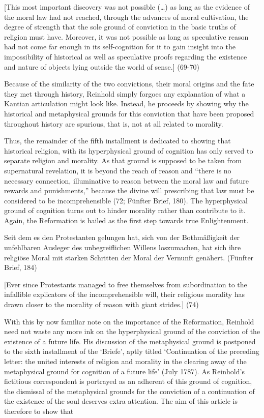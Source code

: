 [This most important discovery was not possible (\ldots ) as long as the evidence of the moral law had not reached, through the advances of moral cultivation, the degree of strength that the sole ground of conviction in the basic truths of religion must have. Moreover, it was not possible as long as speculative reason had not come far enough in its self{-}cognition for it to gain insight into the impossibility of historical as well as speculative proofs regarding the existence and nature of objects lying outside the world of sense.] (69{-}70)

Because of the similarity of the two convictions, their moral origins and the fate they met through history, Reinhold simply forgoes any explanation of what a Kantian articulation might look like. Instead, he proceeds by showing why the historical and metaphysical grounds for this conviction that have been proposed throughout history are spurious, that is, not at all related to morality. 

 Thus, the remainder of the fifth installment is dedicated to showing that historical religion, with its hyperphysical ground of cognition has only served to separate religion and morality. As that ground is supposed to be taken from supernatural revelation, it is beyond the reach of reason and ``there is no necessary connection, illuminative to reason between the moral law and future rewards and punishments,'' because the divine will prescribing that law must be considered to be incomprehensible (72; F\"{u}nfter Brief, 180). The hyperphysical ground of cognition turns out to hinder morality rather than contribute to it. Again, the Reformation is hailed as the first step towards true Enlightenment. 

Seit dem es den Protestanten gelungen hat, sich von der Bothm\"{a}\ss{}igkeit der unfehlbaren Ausleger des unbegreiflichen Willens loszumachen, hat sich ihre religi\"{o}se Moral mit starken Schritten der Moral der Vernunft gen\"{a}hert. (F\"{u}nfter Brief, 184)

[Ever since Protestants managed to free themselves from subordination to the infallible explicators of the incomprehensible will, their religious morality has drawn closer to the morality of reason with giant strides.] (74) 

With this by now familiar note on the importance of the Reformation, Reinhold need not waste any more ink on the hyperphysical ground of the conviction of the existence of a future life. His discussion of the metaphysical ground is postponed to the sixth installment of the `Briefe', aptly titled `Continuation of the preceding letter: the united interests of religion and morality in the clearing away of the metaphysical ground for cognition of a future life' (July 1787). As Reinhold's fictitious correspondent is portrayed as an adherent of this ground of cognition, the dismissal of the metaphysical grounds for the conviction of a continuation of the existence of the soul deserves extra attention. The aim of this article is therefore to show that 

